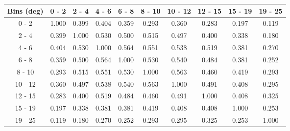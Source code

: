 \documentclass[aps, prd, reprint,showpacs,  preprintnumbers,amsmath,amssymb,superscriptaddress, nofootinbib]{revtex4-1}
\makeatletter
\renewenvironment{table}
  {\def\@captype{table}}
  {}
\makeatother
\begin{document}
\begin{table}
\centering
\begin{tabular}{cccccccccc}
\hline
    Bins (deg) &       0 -  2 &       2 -  4 &       4 -  6 &       6 -  8 &       8 - 10 &      10 - 12 &      12 - 15 &      15 - 19 &      19 - 25 \\ 
\hline
    0 -     2  & 1.000  & 0.399  & 0.404  & 0.359  & 0.293  & 0.360  & 0.283  & 0.197  & 0.119 \\
    2 -     4  & 0.399  & 1.000  & 0.530  & 0.500  & 0.515  & 0.497  & 0.400  & 0.338  & 0.180 \\
    4 -     6  & 0.404  & 0.530  & 1.000  & 0.564  & 0.551  & 0.538  & 0.519  & 0.381  & 0.270 \\
    6 -     8  & 0.359  & 0.500  & 0.564  & 1.000  & 0.530  & 0.540  & 0.484  & 0.381  & 0.252 \\
    8 -    10  & 0.293  & 0.515  & 0.551  & 0.530  & 1.000  & 0.563  & 0.460  & 0.419  & 0.293 \\
   10 -    12  & 0.360  & 0.497  & 0.538  & 0.540  & 0.563  & 1.000  & 0.491  & 0.408  & 0.295 \\
   12 -    15  & 0.283  & 0.400  & 0.519  & 0.484  & 0.460  & 0.491  & 1.000  & 0.408  & 0.325 \\
   15 -    19  & 0.197  & 0.338  & 0.381  & 0.381  & 0.419  & 0.408  & 0.408  & 1.000  & 0.253 \\
   19 -    25  & 0.119  & 0.180  & 0.270  & 0.252  & 0.293  & 0.295  & 0.325  & 0.253  & 1.000 \\
\hline
\hline
\end{tabular}
\caption{Correlation matrix for bins of $d\sigma/d\theta_\mu$.}
\label{tb:piz_muth_cov}
\end{table}

\vspace{0.7cm}
\end{document}
